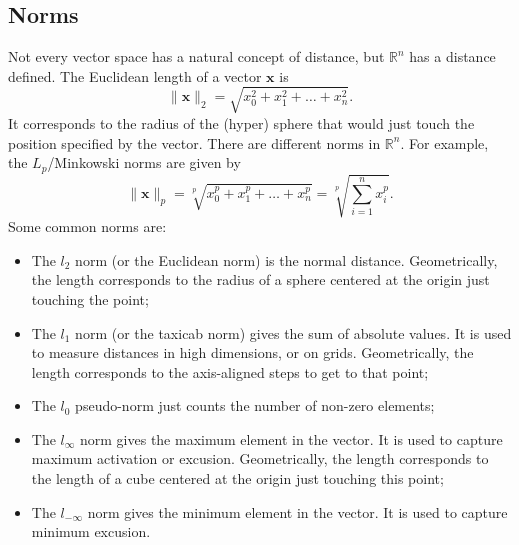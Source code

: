 \documentclass[a4paper, openany]{memoir}
\begin{document}
    \subsection{Norms}
    Not every vector space has a natural concept of distance, but $\mathbb{R}^n$ has a distance defined. The Euclidean length of a vector $\mathbf{x}$ is
    \[\lVert \mathbf{x} \rVert_2 = \sqrt{x_0^2 + x_1^2 + \dots + x_n^2}.\]
    It corresponds to the radius of the (hyper) sphere that would just touch the position specified by the vector. There are different norms in $\mathbb{R}^n$. For example, the $L_p$/Minkowski norms are given by
    \[\lVert \mathbf{x} \rVert_p = \sqrt[p]{x_0^p + x_1^p + \dots + x_n^p} = \sqrt[p]{\sum_{i=1}^{n} x_i^p}.\]
    Some common norms are:
    \begin{itemize}
        \item The $l_2$ norm (or the Euclidean norm) is the normal distance. Geometrically, the length corresponds to the radius of a sphere centered at the origin just touching the point;
        \item The $l_1$ norm (or the taxicab norm) gives the sum of absolute values. It is used to measure distances in high dimensions, or on grids. Geometrically, the length corresponds to the axis-aligned steps to get to that point;
        \item The $l_0$ pseudo-norm just counts the number of non-zero elements;
        \item The $l_\infty$ norm gives the maximum element in the vector. It is used to capture maximum activation or excusion. Geometrically, the length corresponds to the length of a cube centered at the origin just touching this point;
        \item The $l_{-\infty}$ norm gives the minimum element in the vector. It is used to capture minimum excusion.
    \end{itemize}
    
\end{document}

